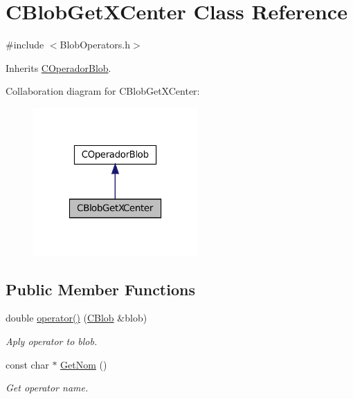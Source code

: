 \hypertarget{class_c_blob_get_x_center}{
\section{CBlobGetXCenter Class Reference}
\label{class_c_blob_get_x_center}
}


{\ttfamily \#include $<$BlobOperators.h$>$}



Inherits \hyperlink{class_c_operador_blob}{COperadorBlob}.



Collaboration diagram for CBlobGetXCenter:
\nopagebreak
\begin{figure}[H]
\begin{center}
\leavevmode
\includegraphics[width=178pt]{class_c_blob_get_x_center__coll__graph}
\end{center}
\end{figure}
\subsection*{Public Member Functions}
\begin{DoxyCompactItemize}
\item 
double \hyperlink{class_c_blob_get_x_center_aaaae40df5c1c031658100b16015896f0}{operator()} (\hyperlink{class_c_blob}{CBlob} \&blob)
\begin{DoxyCompactList}\small\item\em Aply operator to blob. \item\end{DoxyCompactList}\item 
const char $\ast$ \hyperlink{class_c_blob_get_x_center_a56bdbbabb49a6678cd2dd1c86f75f7b2}{GetNom} ()
\begin{DoxyCompactList}\small\item\em Get operator name. \item\end{DoxyCompactList}\end{DoxyCompactItemize}


